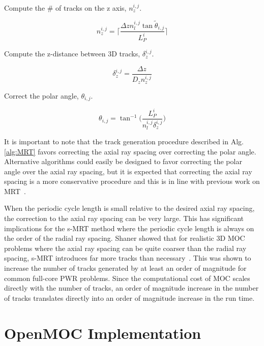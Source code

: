 \begin{algorithm*}[!h]
\begin{algorithmic}
		\State Compute the \# of tracks on the z axis, $n_z^{i,j}$.
		
		\begin{equation}
		n_z^{i,j} = \Bigg\lceil\frac{\Delta z n_l^{i,j} \tan{\tilde{\theta}_{i,j}}}{L_P^i} \Bigg\rceil
		\nonumber
		\end{equation}
		
		\State Compute the z-distance between 3D tracks, $\delta_z^{i,j}$.
		
		\begin{equation}
		\delta_z^{i,j} = \frac{\Delta z}{D_z n_z^{i,j}}
		\nonumber
		\end{equation}
		
		\State Correct the polar angle, $\theta_{i,j}$.
		
		\begin{equation}
		\theta_{i,j} = \tan^{-1} \bigg( \frac{L_P^i}{n_l^{i,j} \delta_z^{i,j}}\bigg)
		\nonumber
		\end{equation}
		
		\EndFor
		\EndFor
	\end{algorithmic}
\end{algorithm*}

It is important to note that the track generation procedure described in Alg. \ref{alg:MRT} favors correcting the axial ray spacing over correcting the polar angle. Alternative algorithms could easily be designed to favor correcting the polar angle over the axial ray spacing, but it is expected that correcting the axial ray spacing is a more conservative procedure and this is in line with previous work on \ac{MRT}~\cite{kochunas}. 

When the periodic cycle length is small relative to the desired axial ray spacing, the correction to the axial ray spacing can be very large. This has significant implications for the \ac{s-MRT} method where the periodic cycle length is always on the order of the radial ray spacing. Shaner showed that for realistic 3D \ac{MOC} problems where the axial ray spacing can be quite coarser than the radial ray spacing, \ac{s-MRT} introduces far more tracks than necessary~\cite{shaner-laydown}. This was shown to increase the number of tracks generated by at least an order of magnitude for common full-core PWR problems. Since the computational cost of \ac{MOC} scales directly with the number of tracks, an order of magnitude increase in the number of tracks translates directly into an order of magnitude increase in the run time.

\section{OpenMOC Implementation}
\label{sec:openmoc-laydown}

